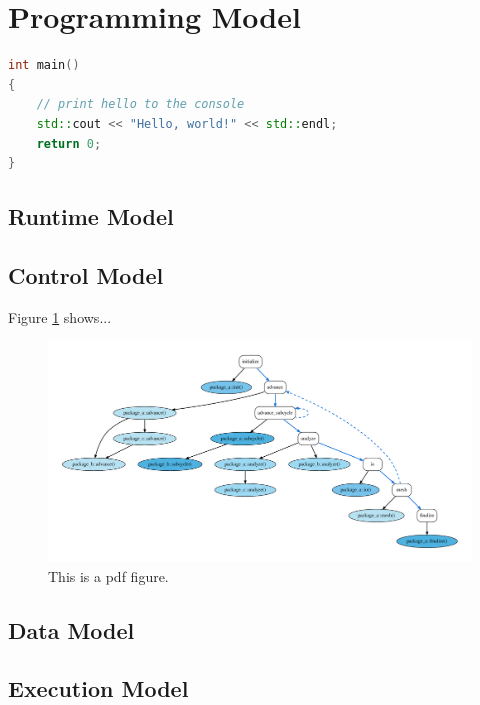 \section*{Programming Model}

\begin{lstlisting}[language=C++, caption={C++ code using listings}]
int main()
{
    // print hello to the console
    std::cout << "Hello, world!" << std::endl;
    return 0;
}
\end{lstlisting}

\subsection*{Runtime Model}

\subsection*{Control Model}

Figure \ref{fig:cycle} shows...

\begin{figure}
\begin{center}
\includegraphics[width=1.0\textwidth]{images/cycle.pdf}
\end{center}
\caption{This is a pdf figure.}
\label{fig:cycle}
\end{figure}

\subsection*{Data Model}

\subsection*{Execution Model}

